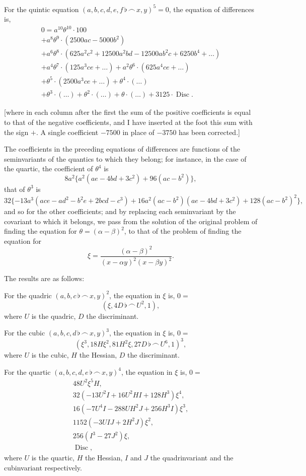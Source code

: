 \documentclass[11pt,a4paper]{book}
\providecommand{\Disc}{\mathop{\mathrm{Disc}}\nolimits}
\begin{document}
For the quintic equation $(a,b,c,d,e,f\,\flat\,\frown\, x,y)^5=0$, the equation of differences is,
\begin{multline*}
0=a^{10}\theta^{10}\cdot100\\
+a^8\theta^9\cdot(2500ac-5000b^2)\\
+a^6\theta^8\cdot(625a^2c^2+12500a^2bd-12500ab^2c+6250b^4+\ldots)\\
+a^4\theta^7\cdot(125a^3ce+\ldots)+a^2\theta^6\cdot(625a^4ce+\ldots)\\
+\theta^5\cdot(2500a^3ce+\ldots)+\theta^4\cdot(\ldots)\\
+\theta^3\cdot(\ldots)+\theta^2\cdot(\ldots)+\theta\cdot(\ldots)+3125\cdot\Disc.
\end{multline*}

[where in each column after the first the sum of the positive coefficients is equal to that of the negative coefficients, and I have inserted at the foot this sum with the sign $+$. A single coefficient $-7500$ in place of $-3750$ has been corrected.]

The coefficients in the preceding equations of differences are functions of the seminvariants of the quantics to which they belong; for instance, in the case of the quartic, the coefficient of $\theta^4$ is
\[
8a^2\{a^2(ae-4bd+3c^2)+96(ac-b^2)\},
\]
that of $\theta^3$ is
\[
32\{-13a^3(ace-ad^2-b^2e+2bcd-c^3)+16a^2(ac-b^2)(ae-4bd+3c^2)+128(ac-b^2)^2\},
\]
and so for the other coefficients; and by replacing each seminvariant by the covariant to which it belongs, we pass from the solution of the original problem of finding the equation for $\theta=(\alpha-\beta)^2$, to that of the problem of finding the equation for
\[
\xi=\frac{(\alpha-\beta)^2}{(x-\alpha y)^2(x-\beta y)^2}.
\]

The results are as follows:

For the quadric $(a,b,c\,\flat\,\frown\, x,y)^2$, the equation in $\xi$ is, $0=$
\[
(\xi,4D\,\flat\,\frown\, U^2,1),
\]
where $U$ is the quadric, $D$ the discriminant.

For the cubic $(a,b,c,d\,\flat\,\frown\, x,y)^3$, the equation in $\xi$ is, $0=$
\[
(\xi^3,18H\xi^2,81H^2\xi,27D\,\flat\,\frown\, U^6,1)^3,
\]
where $U$ is the cubic, $H$ the Hessian, $D$ the discriminant.

For the quartic $(a,b,c,d,e\,\flat\,\frown\, x,y)^4$, the equation in $\xi$ is, $0=$
\begin{multline*}
48U^2\xi^5H,\\
32(-13U^2I+16U^2HI+128H^3)\xi^4,\\
16(-7U^4I-288UH^2J+256H^3I)\xi^3,\\
1152(-3UIJ+2H^2J)\xi^2,\\
256(I^3-27J^2)\xi,\\
\Disc,
\end{multline*}
where $U$ is the quartic, $H$ the Hessian, $I$ and $J$ the quadrinvariant and the cubinvariant respectively.
\end{document}
